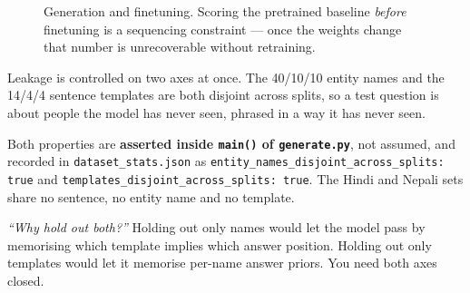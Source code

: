 \documentclass[11pt]{report}
\begin{document}
\begin{figure}[htbp]
\centering
{}
\caption{Generation and finetuning. Scoring the pretrained baseline
\emph{before} finetuning is a sequencing constraint --- once the weights change
that number is unrecoverable without retraining.}
\end{figure}

\begin{shortans}
Leakage is controlled on two axes at once. The 40/10/10 entity names and the
14/4/4 sentence templates are both disjoint across splits, so a test question is
about people the model has never seen, phrased in a way it has never seen.
\end{shortans}

\begin{deeper}
Both properties are \textbf{asserted inside \texttt{main()} of
\texttt{generate.py}}, not assumed, and recorded in
\texttt{dataset\_stats.json} as
\texttt{entity\_names\_disjoint\_across\_splits: true} and
\texttt{templates\_disjoint\_across\_splits: true}. The Hindi and Nepali sets
share no sentence, no entity name and no template.

\medskip
\textit{``Why hold out both?''} Holding out only names would let the model pass
by memorising which template implies which answer position. Holding out only
templates would let it memorise per-name answer priors. You need both axes
closed.
\end{deeper}
\end{document}
